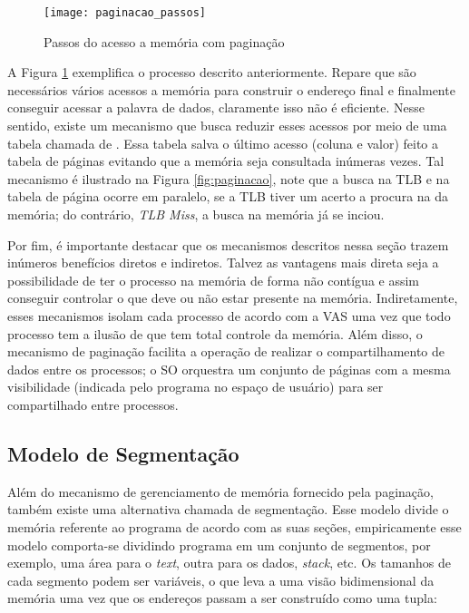 \begin{figure}[!h]
  \centering
  \texttt{[image: paginacao\_passos]} 
  \caption{Passos do acesso a memória com paginação}
  \label{fig:passos_paginacao}
\end{figure}

A Figura \ref{fig:passos_paginacao} exemplifica o processo descrito
anteriormente. Repare que são necessários vários acessos a memória para
construir o endereço final e finalmente conseguir acessar a palavra de dados,
claramente isso não é eficiente. Nesse sentido, existe um mecanismo que busca
reduzir esses acessos por meio de uma tabela chamada de . Essa tabela salva o último acesso (coluna e valor)
feito a tabela de páginas evitando que a memória seja consultada inúmeras
vezes. Tal mecanismo é ilustrado na Figura \ref{fig:paginacao}, note que a
busca na TLB e na tabela de página ocorre em paralelo, se a TLB tiver um acerto
a procura na da memória; do contrário, \textit{TLB Miss}, a busca na memória já
se inciou.

Por fim, é importante destacar que os mecanismos descritos nessa seção trazem
inúmeros benefícios diretos e indiretos. Talvez as vantagens mais direta seja a
possibilidade de ter o processo na memória de forma não contígua e assim
conseguir controlar o que deve ou não estar presente na memória. Indiretamente,
esses mecanismos isolam cada processo de acordo com a VAS uma vez que todo
processo tem a ilusão de que tem total controle da memória. Além disso, o
mecanismo de paginação facilita a operação de realizar o compartilhamento de
dados entre os processos; o SO orquestra um conjunto de páginas com a mesma
visibilidade (indicada pelo programa no espaço de usuário) para ser
compartilhado entre processos.

\subsection{Modelo de Segmentação}

Além do mecanismo de gerenciamento de memória fornecido pela paginação, também
existe uma alternativa chamada de segmentação. Esse modelo divide o memória
referente ao programa de acordo com as suas seções, empiricamente esse modelo
comporta-se dividindo programa em um conjunto de segmentos, por exemplo, uma
área para o \textit{text}, outra para os dados, \textit{stack}, etc. Os
tamanhos de cada segmento podem ser variáveis, o que leva a uma visão
bidimensional da memória uma vez que os endereços passam a ser construído como
uma tupla: \\

